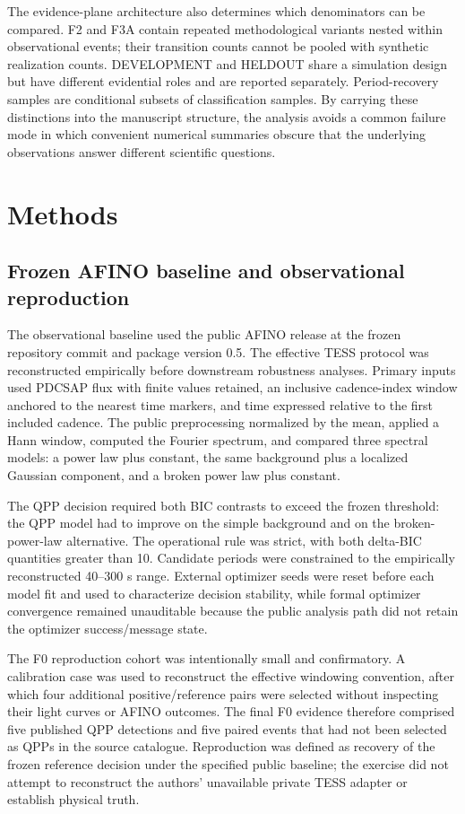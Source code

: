 \documentclass[11pt,a4paper]{article}
\begin{document}



The evidence-plane architecture also determines which denominators can be compared. F2 and F3A contain repeated methodological variants nested within observational events; their transition counts cannot be pooled with synthetic realization counts. DEVELOPMENT and HELDOUT share a simulation design but have different evidential roles and are reported separately. Period-recovery samples are conditional subsets of classification samples. By carrying these distinctions into the manuscript structure, the analysis avoids a common failure mode in which convenient numerical summaries obscure that the underlying observations answer different scientific questions.

\clearpage
\section{Methods}
\subsection{Frozen AFINO baseline and observational reproduction}
The observational baseline used the public AFINO release at the frozen repository commit and package version 0.5. The effective TESS protocol was reconstructed empirically before downstream robustness analyses. Primary inputs used PDCSAP flux with finite values retained, an inclusive cadence-index window anchored to the nearest time markers, and time expressed relative to the first included cadence. The public preprocessing normalized by the mean, applied a Hann window, computed the Fourier spectrum, and compared three spectral models: a power law plus constant, the same background plus a localized Gaussian component, and a broken power law plus constant.

The QPP decision required both BIC contrasts to exceed the frozen threshold: the QPP model had to improve on the simple background and on the broken-power-law alternative. The operational rule was strict, with both delta-BIC quantities greater than 10. Candidate periods were constrained to the empirically reconstructed 40--300 s range. External optimizer seeds were reset before each model fit and used to characterize decision stability, while formal optimizer convergence remained unauditable because the public analysis path did not retain the optimizer success/message state.

The F0 reproduction cohort was intentionally small and confirmatory. A calibration case was used to reconstruct the effective windowing convention, after which four additional positive/reference pairs were selected without inspecting their light curves or AFINO outcomes. The final F0 evidence therefore comprised five published QPP detections and five paired events that had not been selected as QPPs in the source catalogue. Reproduction was defined as recovery of the frozen reference decision under the specified public baseline; the exercise did not attempt to reconstruct the authors' unavailable private TESS adapter or establish physical truth.
\end{document}
